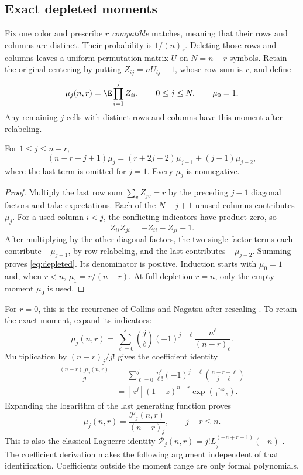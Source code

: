 \subsection{Exact depleted moments}

Fix one color and prescribe $r$ \emph{compatible} matches, meaning that their rows and columns are distinct. Their probability is $1/(n)_r$. Deleting those rows and columns leaves a uniform permutation matrix $U$ on $N=n-r$ symbols. Retain the original centering by putting $Z_{ij}=nU_{ij}-1$, whose row sum is $r$, and define
\[
\mu_j(n,r)=\E\prod_{i=1}^j Z_{ii},\qquad 0\le j\le N,\qquad \mu_0=1.
\]
Any remaining $j$ cells with distinct rows and columns have this moment after relabeling.

\begin{lemma}\label{lem:depleted}
For $1\le j\le n-r$,
\begin{equation}\label{eq:depleted}
(n-r-j+1)\mu_j=(r+2j-2)\mu_{j-1}+(j-1)\mu_{j-2},
\end{equation}
where the last term is omitted for $j=1$. Every $\mu_j$ is nonnegative.
\end{lemma}
\begin{proof}
Multiply the last row sum $\sum_v Z_{jv}=r$ by the preceding $j-1$ diagonal factors and take expectations. Each of the $N-j+1$ unused columns contributes $\mu_j$. For a used column $i<j$, the conflicting indicators have product zero, so
\[
Z_{ii}Z_{ji}=-Z_{ii}-Z_{ji}-1.
\]
After multiplying by the other diagonal factors, the two single-factor terms each contribute $-\mu_{j-1}$, by row relabeling, and the last contributes $-\mu_{j-2}$. Summing proves \eqref{eq:depleted}. Its denominator is positive. Induction starts with $\mu_0=1$ and, when $r<n$, $\mu_1=r/(n-r)$. At full depletion $r=n$, only the empty moment $\mu_0$ is used.
\end{proof}

For $r=0$, this is the recurrence of Collins and Nagatsu after rescaling \cite[Proposition 3.3, equation (16)]{CN}. To retain the exact moment, expand its indicators:
\[
\mu_j(n,r)=\sum_{\ell=0}^j
\binom j\ell(-1)^{j-\ell}\frac{n^\ell}{(n-r)_\ell}.
\]
Multiplication by $(n-r)_j/j!$ gives the coefficient identity
\begin{align*}
\frac{(n-r)_j\mu_j(n,r)}{j!}
&=\sum_{\ell=0}^j\frac{n^\ell}{\ell!}
(-1)^{j-\ell}\binom{n-r-\ell}{j-\ell}\\
&=[z^j](1-z)^{n-r}\exp\left(\frac{nz}{1-z}\right).
\end{align*}
Expanding the logarithm of the last generating function proves
\begin{equation}\label{eq:poly-moment}
\mu_j(n,r)=\frac{\mathcal P_j(n,r)}{(n-r)_j},
\qquad j+r\le n.
\end{equation}
This is also the classical Laguerre identity
$\mathcal P_j(n,r)=j!L_j^{(-n+r-1)}(-n)$ \cite[equation 18.12.13]{DLMF}. The coefficient derivation makes the following argument independent of that identification. Coefficients outside the moment range are only formal polynomials.

